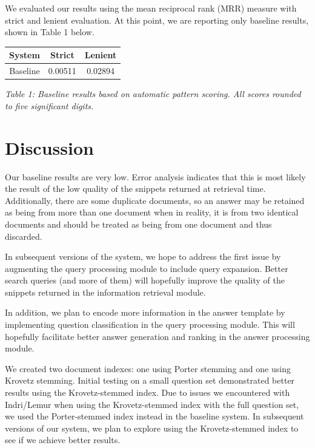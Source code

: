 \documentclass[11pt]{article}
\begin{document}
We evaluated our results using the mean reciprocal rank (MRR) measure with strict and lenient evaluation. At this point, we are reporting only baseline results, shown in Table 1 below.

\vspace{5mm}
{\centering
\begin{tabular}{|c|c|c|}
\hline
\textbf{System} & \textbf{Strict} & \textbf{Lenient} \\ \hline
Baseline & 0.00511 & 0.02894 \\ \hline
\end{tabular}

\vspace{1mm}
\emph{Table 1: Baseline results based on automatic pattern scoring. All scores rounded to five significant digits.}
\par}

\section{Discussion}

Our baseline results are very low.  Error analysis indicates that this is most likely the result of the low quality of the snippets returned at retrieval time.  Additionally, there are some duplicate documents, so an answer may be retained as being from more than one document when in reality, it is from two identical documents and should be treated as being from one document and thus discarded.

In subsequent versions of the system, we hope to address the first issue by augmenting the query processing module to include query expansion. Better search queries (and more of them) will hopefully improve the quality of the snippets returned in the information retrieval module.

In addition, we plan to encode more information in the answer template by implementing question classification in the query processing module. This will hopefully facilitate better answer generation and ranking in the answer processing module.

We created two document indexes: one using Porter stemming and one using Krovetz stemming. Initial testing on a small question set demonstrated better results using the Krovetz-stemmed index. Due to issues we encountered with Indri/Lemur when using the Krovetz-stemmed index with the full question set, we used the Porter-stemmed index instead in the baseline system. In subsequent versions of our system, we plan to explore using the Krovetz-stemmed index to see if we achieve better results.
\end{document}

